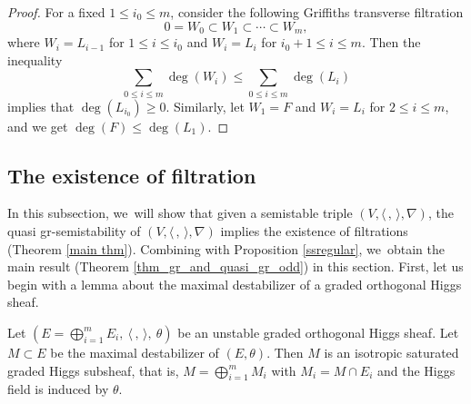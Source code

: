 \begin{proof}
For a fixed $1\leq i_0\leq m$, consider the following Griffiths transverse filtration
\[
0=W_0\subset W_1\subset \cdots\subset W_m,
\]
where $W_i= L_{i-1}$ for $1\leq i\leq i_0$ and $W_i= L_i$ for $i_0+1\leq i\leq m$. Then the inequality
\[
\sum_{0\leq i\leq m}\deg(W_i)\leqslant\sum_{0\leq i\leq m}\deg(L_i)
\]
implies that $\deg(L_{i_0})\geq 0$. Similarly, let $W_1=F$ and $W_i=L_i$ for $2\leq i\leq m$, and we get $\deg(F)\leq \deg(L_1)$.
\end{proof} 

\subsection{The existence of \texorpdfstring{\protect\grsemistable}{grsemistable} filtration}\label{subsect_exist}

In this subsection, we~will show that given a semistable triple $(V, \langle \,, \, \rangle, \nabla)$, the quasi gr-semistability of $(V, \langle \,, \, \rangle, \nabla)$ implies the existence of \grsemistable filtrations (Theorem \ref{main thm}). Combining with Proposition \ref{ssregular}, we~obtain the main result (Theorem \ref{thm_gr_and_quasi_gr_odd}) in this section. First, let us begin with a lemma about the maximal destabilizer of a graded orthogonal Higgs sheaf.

\begin{lem}\label{destabilizer}
Let $(E=\mathop{\bigoplus}_{i=1}^{m} E_i,\ \langle \,, \, \rangle,\ \theta)$ be an unstable graded orthogonal Higgs sheaf. Let $M\subset E$ be the maximal destabilizer of $(E,\theta)$. Then $M$ is an isotropic saturated graded Higgs subsheaf, that is, $M=\mathop{\bigoplus}_{i=1}^{m} M_i$ with $M_i=M\cap E_i$ and the Higgs field is induced by $\theta$.
\end{lem}

